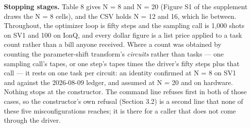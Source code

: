 \documentclass[acmsmall,screen,review]{acmart}
\begin{document}
\textbf{Stopping stages.} Table 8 gives N = 8 and N = 20 (Figure S1 of the supplement draws the N = 8 cells), and the CSV holds N = 12 and 16, which lie between. Throughout, the optimizer loop is fifty steps and the sampling call is 1,000 shots on SV1 and 100 on IonQ, and every dollar figure is a list price applied to a task count rather than a bill anyone received. Where a count was obtained by counting the parameter-shift transform's \textit{circuits} rather than tasks --- one sampling call's tapes, or one step's tapes times the driver's fifty steps plus that call --- it rests on one task per circuit: an identity confirmed at N = 8 on SV1 and against the 2026-08-09 ledger, and assumed at N = 20 and on hardware. Nothing stops at the constructor. The command line refuses first in both of those cases, so the constructor's own refusal (Section 3.2) is a second line that none of these five misconfigurations reaches; it is there for a caller that does not come through the driver.
\end{document}
